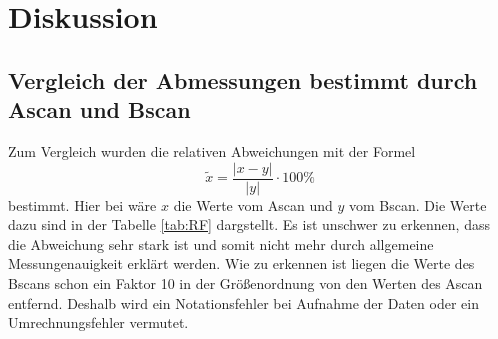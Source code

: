 \section{Diskussion}
\label{sec:Diskussion}
\subsection{Vergleich der Abmessungen bestimmt durch Ascan und Bscan}
Zum Vergleich wurden die relativen Abweichungen mit der Formel
\begin{equation*}
  \tilde{x} = \frac{\lvert x - y\rvert}{\lvert y \rvert} \cdot 100 \%
\end{equation*}
bestimmt. Hier bei wäre $x$ die Werte vom Ascan und $y$ vom Bscan. Die Werte
dazu sind in der Tabelle \ref{tab:RF} dargstellt. Es ist unschwer zu erkennen,
dass die Abweichung sehr stark ist und somit nicht mehr durch allgemeine Messungenauigkeit
erklärt werden.
 Wie zu erkennen ist liegen die Werte des
Bscans schon ein Faktor 10 in der Größenordnung von den Werten des Ascan entfernd. Deshalb
wird ein Notationsfehler bei Aufnahme der Daten oder ein Umrechnungsfehler vermutet.

